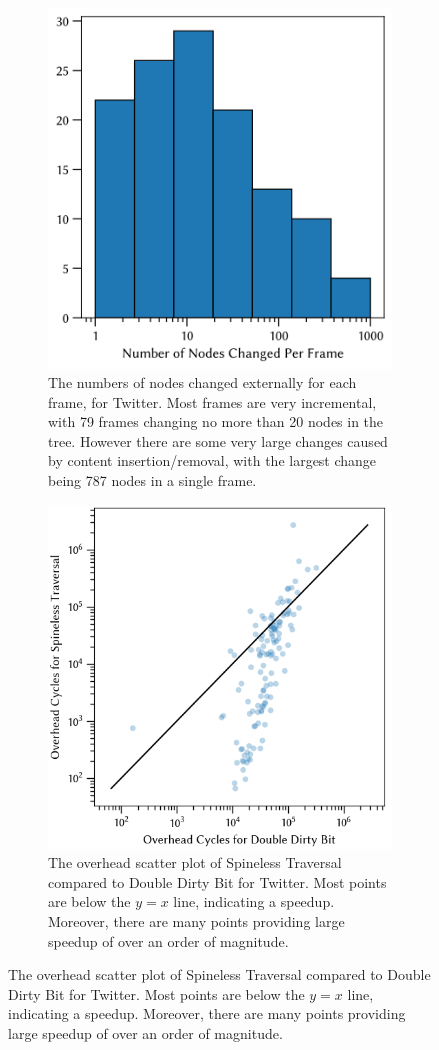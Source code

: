\begin{figure}
\begin{subfigure}{0.48\linewidth}
    \includegraphics[scale=0.45]{CaseStudy.png}
    \caption{The numbers of nodes changed externally for each frame, for Twitter. Most frames are very incremental, with 79 frames changing no more than 20 nodes in the tree. However there are some very large changes caused by content insertion/removal, with the largest change being 787 nodes in a single frame.}
    \label{fig:case-study}
\end{subfigure}\hfill%
\begin{subfigure}{0.48\linewidth}
    \includegraphics[scale=0.5]{CaseStudyOverhead.png}
    \caption{The overhead scatter plot of Spineless Traversal compared to Double Dirty Bit for Twitter. Most points are below the $y=x$ line, indicating a speedup. Moreover, there are many points providing large speedup of over an order of magnitude.}
\end{subfigure}
\end{figure}

